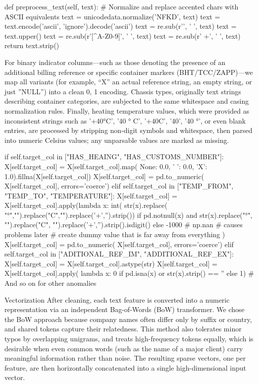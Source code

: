 \begtt {}
def preprocess_text(self, text):
    # Normalize and replace accented chars with ASCII equivalents
    text = unicodedata.normalize('NFKD', text)
    text = text.encode('ascii', 'ignore').decode('ascii')
    text = re.sub(r'\s', ' ', text)
    text = text.upper()
    text = re.sub(r'[^A-Z0-9]', ' ', text)
    text = re.sub(r' +', ' ', text)
    return text.strip()
\endtt

For binary indicator columns—such as those denoting the presence of an additional billing reference or specific container markers (BHT/TCC/ZAPP)—we map all variants (for example, “X” an actual reference string, an empty string, or just ''NULL'') into a clean {0, 1} encoding. Chassis types, originally text strings describing container categories, are subjected to the same whitespace and casing normalization rules. Finally, heating temperature values, which were provided as inconsistent strings such as '+40°C', '40 ° C', '+40C', '40', '40 °', or even blank entries, are processed by stripping non-digit symbols and whitespace, then parsed into numeric Celsius values; any unparsable values are marked as missing.

\begtt {}
if self.target_col in ["HAS_HEAING", "HAS_CUSTOMS_NUMBER"]:
    X[self.target_col] = X[self.target_col].map(
        {None: 0.0, ' ': 0.0, 'X': 1.0}).fillna(X[self.target_col])
    X[self.target_col] = pd.to_numeric(
        X[self.target_col], errors='coerce')
elif self.target_col in ["TEMP_FROM", "TEMP_TO", "TEMPERATURE"]:
    X[self.target_col] = X[self.target_col].apply(lambda x: int(
    str(x).replace(
    "°","").replace("C","").replace('+','').strip()) 
            if pd.notnull(x) and str(x).replace("°", "").replace("C",
            "").replace('+','').strip().isdigit() 
            else -1000 # np.nan # causes problems later
            # create dummy value that is far away from everything
            )
    X[self.target_col] = pd.to_numeric(
        X[self.target_col], errors='coerce')
elif self.target_col in ["ADITIONAL_REF_IM", "ADDITIONAL_REF_EX"]:
    X[self.target_col] = X[self.target_col].astype(str)
    X[self.target_col] = X[self.target_col].apply(
        lambda x: 0 if pd.isna(x) or str(x).strip() == '' else 1)
# And so on for other anomalies
\endtt

\secc Vectorization
After cleaning, each text feature is converted into a numeric representation via an independent Bag-of-Words (BoW) transformer. We chose the BoW approach because company names often differ only by suffix or country, and shared tokens capture their relatedness. This method also tolerates minor typos by overlapping unigrams, and treats high-frequency tokens equally, which is desirable when even common words (such as the name of a major client) carry meaningful information rather than noise.  The resulting sparse vectors, one per feature, are then horizontally concatenated into a single high-dimensional input vector.

